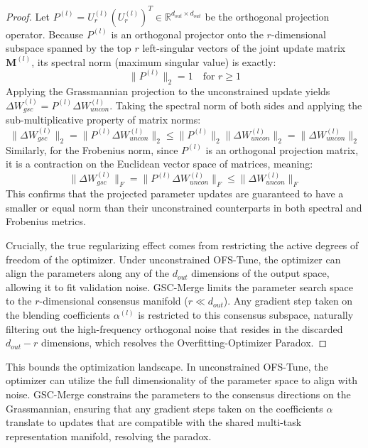 \begin{proof}
Let $P^{(l)} = U_r^{(l)} (U_r^{(l)})^T \in \mathbb{R}^{d_{out} \times d_{out}}$ be the orthogonal projection operator. Because $P^{(l)}$ is an orthogonal projector onto the $r$-dimensional subspace spanned by the top $r$ left-singular vectors of the joint update matrix $\mathbf{M}^{(l)}$, its spectral norm (maximum singular value) is exactly:
\begin{equation}
    \|P^{(l)}\|_2 = 1 \quad \text{for } r \ge 1
\end{equation}
Applying the Grassmannian projection to the unconstrained update yields $\Delta W_{gsc}^{(l)} = P^{(l)} \Delta W_{uncon}^{(l)}$. Taking the spectral norm of both sides and applying the sub-multiplicative property of matrix norms:
\begin{equation}
    \|\Delta W_{gsc}^{(l)}\|_2 = \|P^{(l)} \Delta W_{uncon}^{(l)}\|_2 \le \|P^{(l)}\|_2 \|\Delta W_{uncon}^{(l)}\|_2 = \|\Delta W_{uncon}^{(l)}\|_2
\end{equation}
Similarly, for the Frobenius norm, since $P^{(l)}$ is an orthogonal projection matrix, it is a contraction on the Euclidean vector space of matrices, meaning:
\begin{equation}
    \|\Delta W_{gsc}^{(l)}\|_F = \|P^{(l)} \Delta W_{uncon}^{(l)}\|_F \le \|\Delta W_{uncon}^{(l)}\|_F
\end{equation}
This confirms that the projected parameter updates are guaranteed to have a smaller or equal norm than their unconstrained counterparts in both spectral and Frobenius metrics.

Crucially, the true regularizing effect comes from restricting the active degrees of freedom of the optimizer. Under unconstrained OFS-Tune, the optimizer can align the parameters along any of the $d_{out}$ dimensions of the output space, allowing it to fit validation noise. GSC-Merge limits the parameter search space to the $r$-dimensional consensus manifold ($r \ll d_{out}$). Any gradient step taken on the blending coefficients $\alpha^{(l)}$ is restricted to this consensus subspace, naturally filtering out the high-frequency orthogonal noise that resides in the discarded $d_{out} - r$ dimensions, which resolves the Overfitting-Optimizer Paradox.
\end{proof}

This bounds the optimization landscape. In unconstrained OFS-Tune, the optimizer can utilize the full dimensionality of the parameter space to align with noise. GSC-Merge constrains the parameters to the consensus directions on the Grassmannian, ensuring that any gradient steps taken on the coefficients $\alpha$ translate to updates that are compatible with the shared multi-task representation manifold, resolving the paradox.

